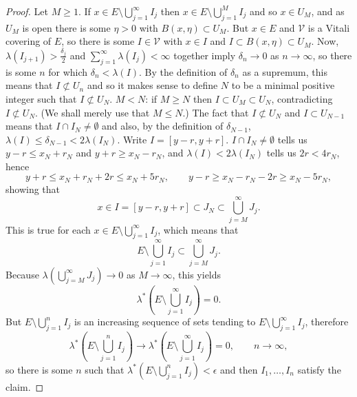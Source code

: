 \documentclass{article}
\theoremstyle{definition}
\begin{document}
\begin{proof}
Let $M \geq 1$. 
If $x \in E \setminus \bigcup_{j=1}^\infty I_j$ then $x \in E \setminus \bigcup_{j=1}^M I_j$ and so
$x \in U_M$, and as $U_M$ is open there is some $\eta>0$ with $B(x,\eta) \subset U_M$. But
$x \in E$ and $\mathcal{V}$ is a Vitali covering of $E$, so there is some $I \in \mathcal{V}$ with
$x \in I$ and $I \subset B(x,\eta) \subset U_M$. Now,
$\lambda(I_{j+1}) > \frac{\delta_j}{2}$ and $\sum_{j=1}^\infty \lambda(I_j)<\infty$ together imply 
 $\delta_n \to 0$ as $n \to \infty$, so there is some $n$ for which $\delta_n<\lambda(I)$. By the definition of
$\delta_n$ as a supremum, this means that $I \not \subset U_n$ and so it makes sense to define $N$ to be a minimal
positive integer such that $I \not \subset U_N$. $M<N$: if $M \geq N$ then
$I \subset U_M \subset U_N$, contradicting $I \not \subset U_N$. (We shall merely use that $M \leq N$.)
The fact that $I \not \subset U_N$ and $I \subset U_{N-1}$ means that $I \cap I_N \neq \emptyset$ and also,
by the definition of $\delta_{N-1}$, $\lambda(I) \leq \delta_{N-1} < 2 \lambda(I_N)$. 
Write $I=[y-r,y+r]$. $I \cap I_N \neq \emptyset$ tells us $y-r \leq x_N+r_N$ and $y+r \geq x_N-r_N$, and 
$\lambda(I) < 2\lambda(I_N)$ tells us
$2r < 4r_N$, hence
\[
y+r \leq x_N+r_N+2r \leq x_N + 5r_N,\qquad y-r \geq x_N-r_N-2r \geq x_N-5r_N,
\]
showing that
\[
x \in I=[y-r,y+r] \subset J_N \subset \bigcup_{j=M}^\infty J_j.
\] 
This is true for each $x \in E \setminus \bigcup_{j=1}^\infty I_j$, which means that
\[
E \setminus \bigcup_{j=1}^\infty I_j \subset \bigcup_{j=M}^\infty J_j.
\]
Because $\lambda( \bigcup_{j=M}^\infty J_j) \to 0$ as $M \to \infty$, this yields 
\[
\lambda^*\left(E \setminus \bigcup_{j=1}^\infty I_j\right) = 0.
\]
But $E \setminus \bigcup_{j=1}^n I_j$ is an increasing sequence of sets tending to
$E \setminus \bigcup_{j=1}^\infty I_j$, therefore
\[
\lambda^*\left(E \setminus \bigcup_{j=1}^n I_j\right) \to \lambda^*\left(E \setminus \bigcup_{j=1}^\infty I_j\right) = 0,
\qquad  n \to \infty,
\]
so there is some $n$ such that $\lambda^*\left(E \setminus \bigcup_{j=1}^n I_j\right) < \epsilon$ and then
$I_1,\ldots,I_n$ satisfy the claim.
\end{proof}
\end{document}
